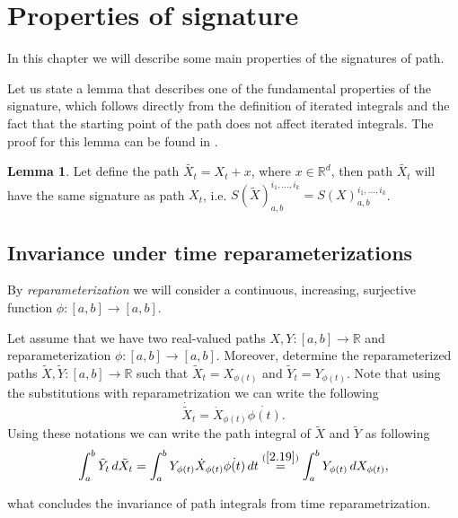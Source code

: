 \documentclass[12pt,a4paper]{report}
\theoremstyle{definition}
\newtheorem{lemma}{Lemma}
\begin{document}



\section{Properties of signature}

In this chapter we will describe some main properties of the signatures of path.

Let us state a lemma that describes one of the fundamental properties of the signature, which follows directly from the definition of iterated integrals and the fact that the starting point of the path does not affect iterated integrals.
The proof for this lemma can be found in \parencite{chevyrev2016primer}.
\begin{lemma}
	Let define the path $\tilde{X_t} = X_t + x$, where $x\in\mathbb{R}^d$, then path $\tilde{X_t}$ will have the same signature as path $X_t$, i.e. $S(\tilde{X})_{a,b}^{i_1,...,i_k}= S(X)_{a,b}^{i_1,...,i_k}$.
\end{lemma}

\subsection{Invariance under time reparameterizations}

By \textit{reparameterization} we will consider a continuous, increasing, surjective function $\phi:[a,b]\rightarrow[a,b]$. 

Let assume that we have two real-valued paths $X,Y:[a, b]\rightarrow\mathbb{R}$ and reparameterization $\phi:[a,b]\rightarrow[a,b]$. Moreover, determine the reparameterized paths $\tilde{X},\tilde{Y}: [a,b]\rightarrow\mathbb{R}$ such that $\tilde{X}_t=X_{\phi(t)}$ and $\tilde{Y}_t = Y_{\phi(t)}$. Note that using the substitutions with reparametrization we can write the following 
\begin{equation}\label{2.19}
	\dot{\tilde{X}}_t=\dot{X}_{\phi(t)}\dot{\phi(t)}.
\end{equation}	
Using these notations we can write the path integral of $\tilde{X}$ and $\tilde{Y}$ as following
\begin{equation}	
		\int_{a}^{b} \tilde{Y}_t\,d\tilde{X}_t=\int_{a}^{b} Y_{\phi(t)}\dot{ X}_{\phi(t)}\dot{\phi(t)} \,dt\overset{(\ref{2.19})}=\int_{a}^{b} Y_{\phi(t)}\,dX_{\phi(t)},
\end{equation}	

what concludes the invariance of path integrals from time reparametrization.
\end{document}
